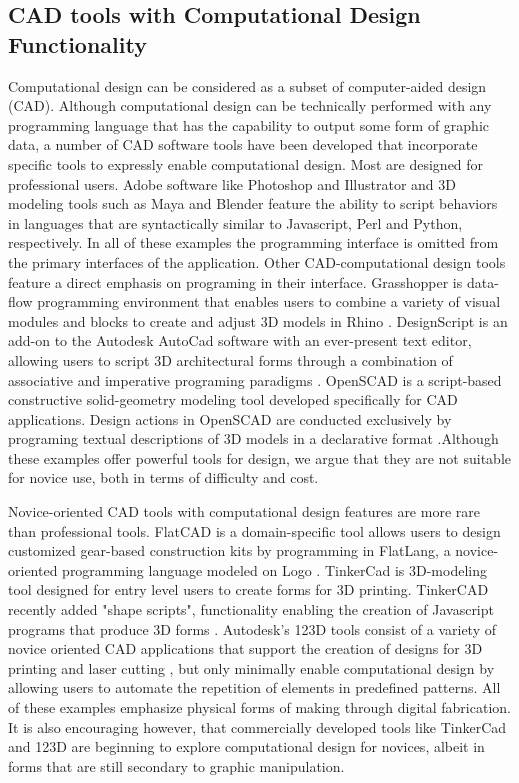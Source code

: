 \documentclass{sigchi}
\begin{document}
\subsection{CAD tools with Computational Design Functionality} %
Computational design can be considered as a subset of computer-aided design (CAD). Although computational design can be technically performed with any programming language that has the capability to output some form of graphic data, a number of CAD software tools have been developed that incorporate specific tools to expressly enable computational design. Most are designed for professional users. Adobe software like Photoshop and Illustrator and 3D modeling tools such as Maya and Blender feature the ability to script behaviors in languages that are syntactically similar to Javascript, Perl and Python, respectively. In all of these examples the programming interface is omitted from the primary interfaces of the application. Other CAD-computational design tools feature a direct emphasis on programing in their interface. Grasshopper is data-flow programming environment that enables users to combine a variety of visual modules and blocks to create and adjust 3D models in Rhino \cite{grasshopper}. DesignScript is an add-on to the Autodesk AutoCad software with an ever-present text editor, allowing users to script 3D architectural forms through a combination of associative and imperative programing paradigms \cite{DesignScript}. OpenSCAD is a script-based constructive solid-geometry modeling tool developed specifically for CAD applications. Design actions in OpenSCAD are conducted exclusively by programing textual descriptions of 3D models in a declarative format \cite{OpenScad}.Although these examples offer powerful tools for design, we argue that they are not suitable for novice use, both in terms of difficulty and cost.

Novice-oriented CAD tools with computational design features are more rare than professional tools. FlatCAD is a domain-specific tool allows users to design customized gear-based construction kits by programming in FlatLang, a novice-oriented programming language modeled on Logo \cite{flatcad}. TinkerCad is 3D-modeling tool designed for entry level users to create forms for 3D printing. TinkerCAD recently added "shape scripts", functionality enabling the creation of Javascript programs that produce 3D forms \cite{tinkercad}. Autodesk's 123D tools consist of a variety of novice oriented CAD applications that support the creation of designs for 3D printing and laser cutting \cite{123D}, but only minimally enable computational design by allowing users to automate the repetition of elements in predefined patterns. All of these examples emphasize physical forms of making through digital fabrication. It is also encouraging however, that commercially developed tools like TinkerCad and 123D are beginning to explore computational design for novices, albeit in forms that are still secondary to graphic manipulation. %
\end{document}
